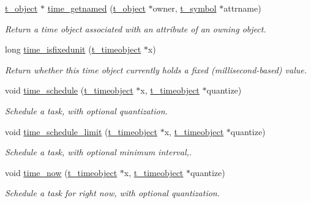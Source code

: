 \begin{DoxyCompactItemize}
\hyperlink{structt__object}{t\_\-object} $\ast$ \hyperlink{group__time_ga2805d69712a55bf77d5083da40108cec}{time\_\-getnamed} (\hyperlink{structt__object}{t\_\-object} $\ast$owner, \hyperlink{structt__symbol}{t\_\-symbol} $\ast$attrname)
\begin{DoxyCompactList}\small\item\em Return a time object associated with an attribute of an owning object. \item\end{DoxyCompactList}\item 
long \hyperlink{group__time_ga86feb1c21b06217bf699447babb169c5}{time\_\-isfixedunit} (\hyperlink{group__time_gab568d2ffd4d84ca17c0b90cf2f7c6a40}{t\_\-timeobject} $\ast$x)
\begin{DoxyCompactList}\small\item\em Return whether this time object currently holds a fixed (millisecond-\/based) value. \item\end{DoxyCompactList}\item 
void \hyperlink{group__time_gae46ab99a9732990170ce0e27fb744c4b}{time\_\-schedule} (\hyperlink{group__time_gab568d2ffd4d84ca17c0b90cf2f7c6a40}{t\_\-timeobject} $\ast$x, \hyperlink{group__time_gab568d2ffd4d84ca17c0b90cf2f7c6a40}{t\_\-timeobject} $\ast$quantize)
\begin{DoxyCompactList}\small\item\em Schedule a task, with optional quantization. \item\end{DoxyCompactList}\item 
void \hyperlink{group__time_ga96226d122f6f0d7e2e1ebe47b06d00c5}{time\_\-schedule\_\-limit} (\hyperlink{group__time_gab568d2ffd4d84ca17c0b90cf2f7c6a40}{t\_\-timeobject} $\ast$x, \hyperlink{group__time_gab568d2ffd4d84ca17c0b90cf2f7c6a40}{t\_\-timeobject} $\ast$quantize)
\begin{DoxyCompactList}\small\item\em Schedule a task, with optional minimum interval,. \item\end{DoxyCompactList}\item 
void \hyperlink{group__time_ga75b99466073d15d4096fb34a5b172648}{time\_\-now} (\hyperlink{group__time_gab568d2ffd4d84ca17c0b90cf2f7c6a40}{t\_\-timeobject} $\ast$x, \hyperlink{group__time_gab568d2ffd4d84ca17c0b90cf2f7c6a40}{t\_\-timeobject} $\ast$quantize)
\begin{DoxyCompactList}\small\item\em Schedule a task for right now, with optional quantization. \item\end{DoxyCompactList}\item 

\end{DoxyCompactItemize}
